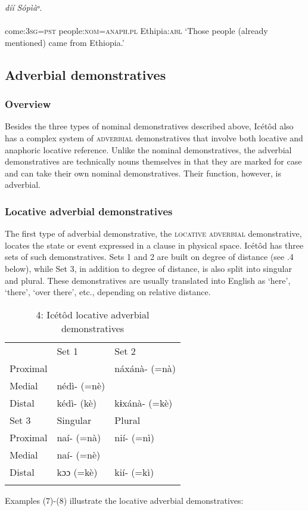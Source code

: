 \ea\label{ex:}
 \textit{díí}\textit{            Sópìàᵒ.} \\
    \\
come:\textsc{3sg}=\textsc{pst}   people:\textsc{nom}=\textsc{anaph.pl}  Ethipia:\textsc{abl}
\glt ‘Those people (already mentioned) came from Ethiopia.’ 
\z






\subsection{Adverbial demonstratives}
\subsubsection{Overview}

Besides the three types of nominal demonstratives described above, Icétôd also has a complex system of \textsc{adverbial} demonstratives that involve both locative and anaphoric locative reference. Unlike the nominal demonstratives, the adverbial demonstratives are technically nouns themselves in that they are marked for case and can take their own nominal demonstratives. Their function, however, is adverbial.


\subsubsection{Locative adverbial demonstratives}

The first type of adverbial demonstrative, the \textsc{locative adverbial} demonstrative, locates the state or event expressed in a clause in physical space. Icétôd has three sets of such demonstratives. Sets 1 and 2 are built on degree of distance (see .4 below), while Set 3, in addition to degree of distance, is also split into singular and plural. These demonstratives are usually translated into English as ‘here’, ‘there’, ‘over there’, etc., depending on relative distance. 


\begin{table}
\caption{4: Icétôd locative adverbial demonstratives}
\label{tab:6}


\begin{tabularx}{\textwidth}{XXX} & \multicolumn{1}{X}{Set 1} & Set 2\\
\lsptoprule
Proximal & \multicolumn{1}{X}{} & náxánà- (=nà)\\
Medial & \multicolumn{1}{X}{nédì- (=nè)} & \\
Distal & \multicolumn{1}{X}{kédì- (kè)} & kɨxánà- (=kè)\\
\multicolumn{1}{X}{Set 3} & Singular & Plural\\
Proximal & naí- (=nà) & nií- (=nì)\\
Medial & naí- (=nè) & \\
Distal & kɔɔ (=kè) & kií- (=kì)\\
\lspbottomrule
\end{tabularx}
\end{table}
Examples (7)-(8) illustrate the locative adverbial demonstratives:




